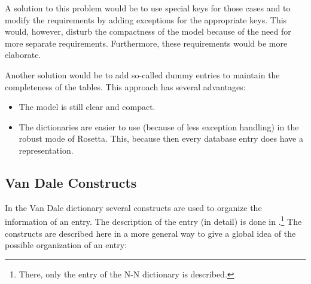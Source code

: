 A solution to this problem would be to use special keys for those cases and 
to modify the 
requirements by adding exceptions for the appropriate keys. This would, however,
disturb the compactness of the model because of the need for more separate 
requirements. Furthermore, these requirements would be more elaborate.
 
Another solution would be to add so-called dummy entries to maintain the
completeness of the tables. This approach has several advantages:
\begin{itemize}
   \item The model is still clear and compact.
   \item The dictionaries are easier to use (because of less exception handling)
         in the robust mode of Rosetta. This, because then every database entry          does have a representation.
\end{itemize}
 
\subsection{Van Dale Constructs}
 
In the Van Dale dictionary several constructs are used to organize the 
information of an entry. The description of the entry (in detail) is done
in \cite{sm:descr}.\footnote{There, only the entry of the N-N dictionary is 
described.} The
constructs are described here in a more general way to give a global idea of
the possible organization of an entry:
 
